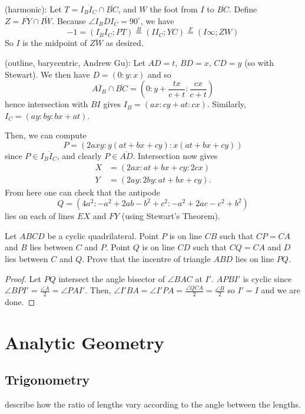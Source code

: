 \begin{solution}
(harmonic): Let $T = \overline{I_B I_C} \cap \overline{BC}$, and $W$ the foot from $I$ to $\overline{BC}$. Define $Z = \overline{FY} \cap \overline{IW}$. Because $\angle I_B D I_C = 90^{\circ}$, we have\[ -1 = (I_B I_C; PT) \overset{B}{=} (I I_C; YC) 	\overset{F}{=} (I\infty; ZW) \]So $I$ is the midpoint of $\overline{ZW}$ as desired.
\end{solution}

\begin{solution}
(outline, barycentric, Andrew Gu): Let $AD = t$, $BD = x$, $CD = y$ (so with Stewart). We then have $D = (0:y:x)$ and so\[ \overline{AI_B} \cap \overline{BC} = \left( 0 : y + \frac{tx}{c+t} : \frac{cx}{c+t} \right) \]hence intersection with $BI$ gives $I_B = (ax : cy+at : cx)$. Similarly, $I_C = (ay : by : bx+at)$.

Then, we can compute\[ P = \left( 2axy : y(at+bx+cy) : x(at+bx+cy) \right) \]since $P \in \overline{I_B I_C}$, and clearly $P \in \overline{AD}$. Intersection now gives\begin{align*} 	X &= \left( 2ax : at+bx+cy : 2cx \right) \\ 	Y &= \left( 2ay : 2by : at+bx+cy \right). \end{align*}From here one can check that the antipode\[ Q = \left( 4a^2 : -a^2+2ab-b^2+c^2 : -a^2+2ac-c^2+b^2 \right) \]lies on each of lines $EX$ and $FY$ (using Stewart's Theorem).
\end{solution}
\pagebreak

\begin{prbm}
Let $ABCD$ be a cyclic quadrilateral. Point $P$ is on line $CB$ such that $CP=CA$and $B$ lies between $C$ and $P$. Point $Q$ is on line $CD$ such that $CQ=CA$ and $D$ lies between $C$ and $Q$. Prove that the incentre of triangle $ABD$ lies on line $PQ$.
\end{prbm}

\begin{proof}
Let $PQ$ intersect the angle bisector of $\angle{BAC}$ at $I'$. $APBI'$ is cyclic since $\angle{BPI'}=\frac{\angle{A}}{2}=\angle{PAI'}$. Then, $\angle{I'BA}=\angle{I'PA}=\frac{\angle{QCA}}{2}=\frac{\angle{B}}{2}$ so $I'=I$ and we are done.
\end{proof}

\chapter{Analytic Geometry}
\section{Trigonometry}
 describe how the ratio of lengths vary according to the angle between the lengths.

